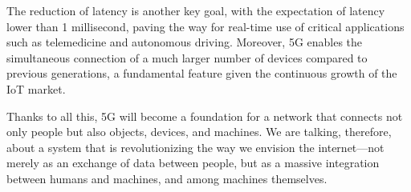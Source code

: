 \documentclass[english]{article}
\begin{document}
The reduction of latency is another key goal, with the expectation of latency
lower than 1 millisecond, paving the way for real-time use of critical
applications such as telemedicine and autonomous driving. Moreover, 5G enables
the simultaneous connection of a much larger number of devices compared to
previous generations, a fundamental feature given the continuous growth of the
IoT market.

Thanks to all this, 5G will become a foundation for a network that connects not
only people but also objects, devices, and machines. We are talking, therefore,
about a system that is revolutionizing the way we envision the internet—not
merely as an exchange of data between people, but as a massive integration
between humans and machines, and among machines themselves.
\end{document}
